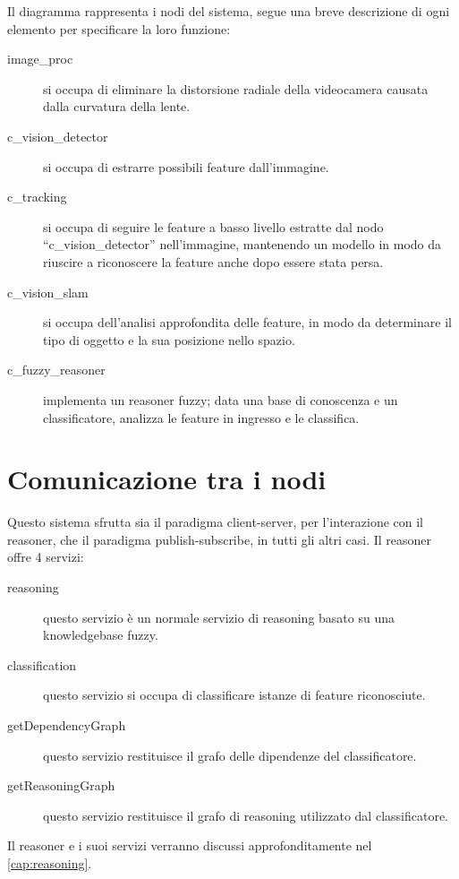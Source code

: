 Il diagramma rappresenta i nodi del sistema, segue una breve descrizione di ogni elemento per specificare la loro funzione:

\begin{description}
  \item [image\_proc] si occupa di eliminare la distorsione radiale della videocamera causata dalla curvatura della lente.
  \item [c\_vision\_detector] si occupa di estrarre possibili feature dall'immagine.
  \item [c\_tracking] si occupa di seguire le feature a basso livello estratte dal nodo ``c\_vision\_detector'' nell'immagine, mantenendo un modello in modo da riuscire a riconoscere la feature anche dopo essere stata persa. 
  \item [c\_vision\_slam] si occupa dell'analisi approfondita delle feature, in modo da determinare il tipo di oggetto e la sua posizione nello spazio. 
  \item [c\_fuzzy\_reasoner] implementa un reasoner fuzzy; data una base di conoscenza e un classificatore, analizza le feature in ingresso e le classifica. 
\end{description}


\section{Comunicazione tra i nodi}

Questo sistema sfrutta sia il paradigma client-server, per l'interazione con il reasoner, che il paradigma publish-subscribe, in tutti gli altri casi.
Il reasoner offre 4 servizi:

\begin{description}
 \item [\/reasoning] questo servizio è un normale servizio di reasoning basato su una knowledgebase fuzzy.
 \item [\/classification] questo servizio si occupa di classificare istanze di feature riconosciute.
 \item [\/getDependencyGraph] questo servizio restituisce il grafo delle dipendenze del classificatore.
 \item [\/getReasoningGraph] questo servizio restituisce il grafo di reasoning utilizzato dal classificatore.
\end{description}

Il reasoner e i suoi servizi verranno discussi approfonditamente  nel \autoref{cap:reasoning}.


